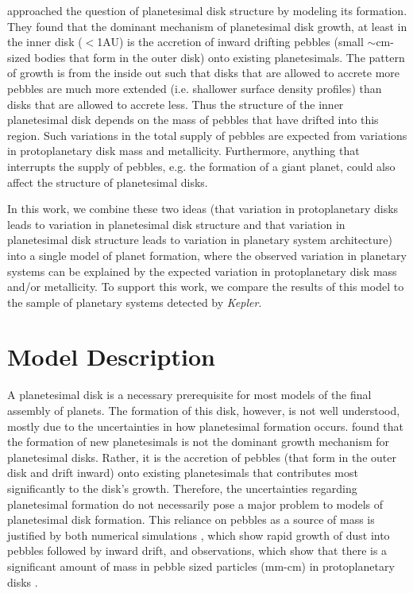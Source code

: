 \documentclass{emulateapj}
\def\kepler{{\slshape Kepler}}
\begin{document}
 \citet{Moriarty15} approached the question of planetesimal disk structure by modeling its formation. They found that the dominant mechanism of planetesimal disk growth, at least in the inner disk ($<$1AU) is the accretion of inward drifting pebbles (small $\sim$cm-sized bodies that form in the outer disk) onto existing planetesimals. The pattern of growth is from the inside out such that disks that are allowed to accrete more pebbles are much more extended (i.e. shallower surface density profiles) than disks that are allowed to accrete less. Thus the structure of the inner planetesimal disk depends on the mass of pebbles that have drifted into this region. Such variations in the total supply of pebbles are expected from variations in protoplanetary disk mass and metallicity. Furthermore, anything that interrupts the supply of pebbles, e.g. the formation of a giant planet, could also affect the structure of planetesimal disks.

 In this work, we combine these two ideas (that variation in protoplanetary disks leads to variation in planetesimal disk structure and that variation in planetesimal disk structure leads to variation in planetary system architecture) into a single model of planet formation, where the observed variation in planetary systems can be explained by the expected variation in protoplanetary disk mass and/or metallicity.  To support this work, we compare the results of this model to the sample of planetary systems detected by \kepler.


\section{Model Description}

A planetesimal disk is a necessary prerequisite for most models of the final assembly of planets. The formation of this disk, however, is not well understood, mostly due to the uncertainties in how planetesimal formation occurs. \citet{Moriarty15} found that the formation of new planetesimals is not the dominant growth mechanism for planetesimal disks. Rather, it is the accretion of pebbles (that form in the outer disk and drift inward) onto existing planetesimals that contributes most significantly to the disk's growth. Therefore, the uncertainties regarding planetesimal formation do not necessarily pose a major problem to models of planetesimal disk formation. This reliance on pebbles as a source of mass is justified by both numerical simulations \citep[e.g.][]{Brauer08, Birnstiel10}, which show rapid growth of dust into pebbles followed by inward drift, and observations, which show that there is a significant amount of mass in pebble sized particles (mm-cm) in protoplanetary disks \citep[][and references therin]{Testi14}.
\end{document}
